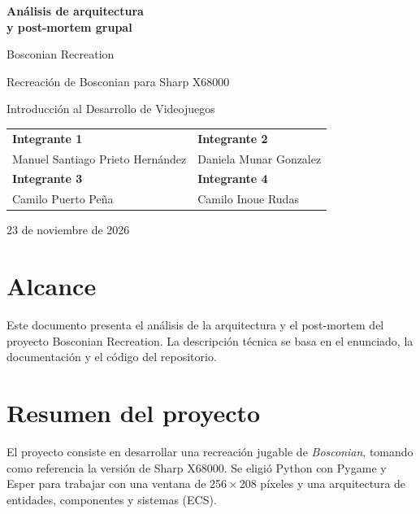 \documentclass[12pt,letterpaper]{report}
\begin{document}
\hypersetup{pageanchor=false}
\begin{titlepage}
\centering
\vspace*{1.2cm}
{\Huge\bfseries Análisis de arquitectura\\[0.35em] y post-mortem grupal\par}
\vspace{1.0cm}
{\LARGE Bosconian Recreation\par}
\vspace{0.25cm}
{\large Recreación de Bosconian para Sharp X68000\par}
\vspace{0.5cm}
{\large Introducción al Desarrollo de Videojuegos\par}
\vfill
\begin{tabular}{>{\centering\arraybackslash}p{} >{\centering\arraybackslash}p{}}
\textbf{Integrante 1} & \textbf{Integrante 2} \\
Manuel Santiago Prieto Hernández & Daniela Munar Gonzalez \\
[1.4em]
\textbf{Integrante 3} & \textbf{Integrante 4} \\
Camilo Puerto Peña & Camilo Inoue Rudas \\
\end{tabular}
\vfill
{\large 23 de noviembre de 2026\par}
\end{titlepage}
\hypersetup{pageanchor=true}
\tableofcontents
\clearpage
{}

\chapter*{Alcance}
Este documento presenta el análisis de la arquitectura y el post-mortem del proyecto Bosconian Recreation. La descripción técnica se basa en el enunciado, la documentación y el código del repositorio.

\chapter{Resumen del proyecto}

El proyecto consiste en desarrollar una recreación jugable de \emph{Bosconian}, tomando como referencia la versión de Sharp X68000. Se eligió Python con Pygame y Esper para trabajar con una ventana de 256\,$\times$\,208 píxeles y una arquitectura de entidades, componentes y sistemas (ECS).
\end{document}
